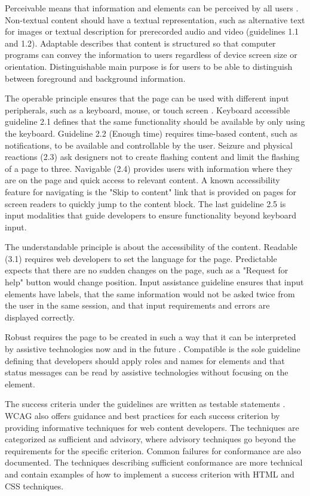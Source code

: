 Perceivable means that information and elements can be perceived by all users \citep{wcag22}. Non-textual content should have a textual representation, such as alternative text for images or textual description for prerecorded audio and video (guidelines 1.1 and 1.2). Adaptable describes that content is structured so that computer programs can convey the information to users regardless of device screen size or orientation. Distinguishable main purpose is for users to be able to distinguish between foreground and background information.

The operable principle ensures that the page can be used with different input peripherals, such as a keyboard, mouse, or touch screen \citep{wcag22}. Keyboard accessible guideline 2.1 defines that the same functionality should be available by only using the keyboard. Guideline 2.2 (Enough time) requires time-based content, such as notifications, to be available and controllable by the user. Seizure and physical reactions (2.3) ask designers not to create flashing content and limit the flashing of a page to three. Navigable (2.4) provides users with information where they are on the page and quick access to relevant content. A known accessibility feature for navigating is the "Skip to content" link that is provided on pages for screen readers to quickly jump to the content block. The last guideline 2.5 is input modalities that guide developers to ensure functionality beyond keyboard input.

The understandable principle is about the accessibility of the content. Readable (3.1) requires web developers to set the language for the page. Predictable expects that there are no sudden changes on the page, such as a "Request for help" button would change position. Input assistance guideline ensures that input elements have labels, that the same information would not be asked twice from the user in the same session, and that input requirements and errors are displayed correctly. 

Robust requires the page to be created in such a way that it can be interpreted by assistive technologies now and in the future \citep{wcag22}. Compatible is the sole guideline defining that developers should apply roles and names for elements and that status messages can be read by assistive technologies without focusing on the element.

The success criteria under the guidelines are written as testable statements \citep{wcag22}. WCAG also offers guidance and best practices for each success criterion by providing informative techniques for web content developers. The techniques are categorized as sufficient and advisory, where advisory techniques go beyond the requirements for the specific criterion. Common failures for conformance are also documented. The techniques describing sufficient conformance are more technical and contain examples of how to implement a success criterion with HTML and CSS techniques. 

